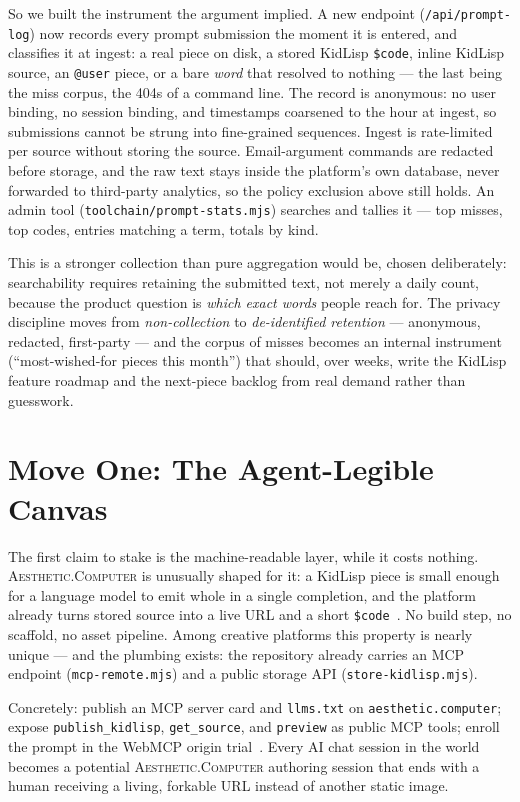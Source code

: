 \documentclass[10pt,letterpaper,twocolumn]{article}
\newcommand{\ac}{\textsc{Aesthetic.Computer}}
\begin{document}
So we built the instrument the argument implied. A new endpoint (\texttt{/api/prompt-log}) now records every prompt submission the moment it is entered, and classifies it at ingest: a real piece on disk, a stored KidLisp \texttt{\$code}, inline KidLisp source, an \texttt{@user} piece, or a bare \emph{word} that resolved to nothing --- the last being the miss corpus, the 404s of a command line. The record is anonymous: no user binding, no session binding, and timestamps coarsened to the hour at ingest, so submissions cannot be strung into fine-grained sequences. Ingest is rate-limited per source without storing the source. Email-argument commands are redacted before storage, and the raw text stays inside the platform's own database, never forwarded to third-party analytics, so the policy exclusion above still holds. An admin tool (\texttt{toolchain/prompt-stats.mjs}) searches and tallies it --- top misses, top codes, entries matching a term, totals by kind.

This is a stronger collection than pure aggregation would be, chosen deliberately: searchability requires retaining the submitted text, not merely a daily count, because the product question is \emph{which exact words} people reach for. The privacy discipline moves from \emph{non-collection} to \emph{de-identified retention} --- anonymous, redacted, first-party --- and the corpus of misses becomes an internal instrument (``most-wished-for pieces this month'') that should, over weeks, write the KidLisp feature roadmap and the next-piece backlog from real demand rather than guesswork.

\section{Move One: The Agent-Legible Canvas}

The first claim to stake is the machine-readable layer, while it costs nothing. \ac{} is unusually shaped for it: a KidLisp piece is small enough for a language model to emit whole in a single completion, and the platform already turns stored source into a live URL and a short \texttt{\$code}~\citep{scudder2026kidlisp}. No build step, no scaffold, no asset pipeline. Among creative platforms this property is nearly unique --- and the plumbing exists: the repository already carries an MCP endpoint (\texttt{mcp-remote.mjs}) and a public storage API (\texttt{store-kidlisp.mjs}).

Concretely: publish an MCP server card and \texttt{llms.txt} on \texttt{aesthetic.computer}; expose \texttt{publish\_kidlisp}, \texttt{get\_source}, and \texttt{preview} as public MCP tools; enroll the prompt in the WebMCP origin trial~\citep{discoveredlabs2026webmcp}. Every AI chat session in the world becomes a potential \ac{} authoring session that ends with a human receiving a living, forkable URL instead of another static image.
\end{document}
